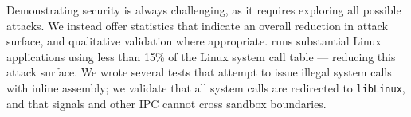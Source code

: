 



Demonstrating security is always challenging, as it requires exploring all possible attacks.
We instead offer statistics that indicate an overall reduction in attack surface,
and qualitative validation where appropriate.
\graphene{} runs substantial Linux applications using less than 15\% of the
Linux system call table
--- reducing this attack surface.
We wrote several tests that attempt to issue illegal system calls with inline assembly;
we validate that all system calls are redirected to {\tt libLinux},
and that signals and other IPC cannot cross sandbox boundaries.





\begin{comment}
In our design, only trusted applications such as system utilities can run as a non-\graphene{} \picoproc{}, as they need many more functionality that the \graphene{} Linux ABI support. From a security standpoint, nothing prevents a \graphene{} \picoprocs{} from acting maliciously, as application code runs unmodified in \graphene{}.  However, it is important to note that \graphene{}’s goal is not to secure a system but to isolate applications in a competitive level compared to the VM alternative. 
\end{comment}

